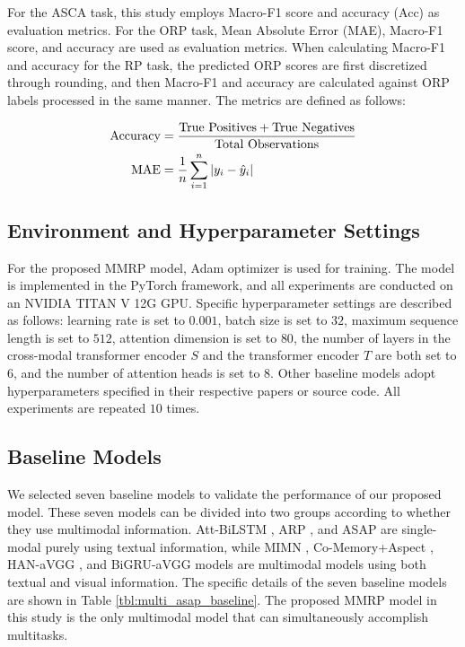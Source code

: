 \documentclass[preprint,12pt]{elsarticle}
\begin{document}
For the ASCA task, this study employs Macro-F1 score and accuracy (Acc) as evaluation metrics. For the ORP task, Mean Absolute Error (MAE), Macro-F1 score, and accuracy are used as evaluation metrics. When calculating Macro-F1 and accuracy for the RP task, the predicted ORP scores are first discretized through rounding, and then Macro-F1 and accuracy are calculated against ORP labels processed in the same manner. The metrics are defined as follows:

\begin{equation}
\centering
\begin{aligned}
\text{Accuracy} &= \frac{\text{True Positives} + \text{True Negatives}}{\text{Total Observations}} \\
\text{MAE} &= \frac{1}{n} \sum_{i=1}^{n} |y_i - \hat{y}_i|
\end{aligned}
\end{equation}


\subsection{Environment and Hyperparameter Settings}

For the proposed MMRP model, Adam optimizer is used for training. The model is implemented in the PyTorch framework, and all experiments are conducted on an NVIDIA TITAN V 12G GPU. Specific hyperparameter settings are described as follows: learning rate is set to $0.001$, batch size is set to $32$, maximum sequence length is set to $512$, attention dimension is set to $80$, the number of layers in the cross-modal transformer encoder $S$ and the transformer encoder $T$ are both set to $6$, and the number of attention heads is set to $8$. Other baseline models adopt hyperparameters specified in their respective papers or source code. All experiments are repeated $10$ times.

\subsection{Baseline Models}

We selected seven baseline models to validate the performance of our proposed model. These seven models can be divided into two groups according to whether they use multimodal information. Att-BiLSTM \citep{zhou2016attention}, ARP \citep{wu2019arp}, and ASAP \citep{bu2021asap} are single-modal purely using textual information, while MIMN \citep{xu2019multi}, Co-Memory+Aspect \citep{xu2017multisentinet}, HAN-aVGG \citep{yang2016hierarchical}, and BiGRU-aVGG \citep{tang2015document} models are multimodal models using both textual and visual information. The specific details of the seven baseline models are shown in Table \ref{tbl:multi_asap_baseline}. The proposed MMRP model in this study is the only multimodal model that can simultaneously accomplish multitasks. 
\end{document}
